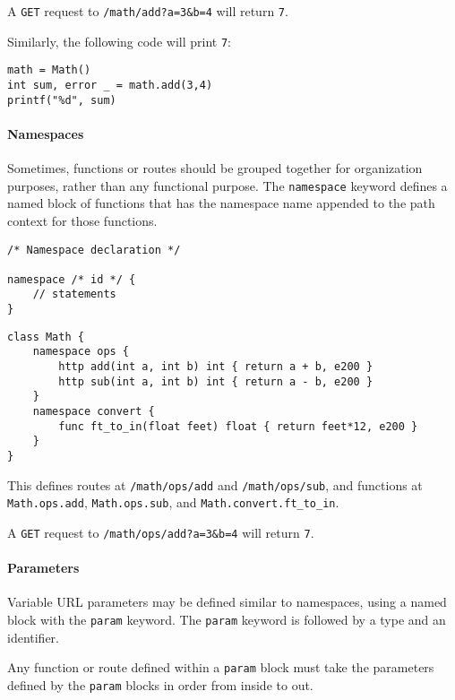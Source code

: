 A \texttt{GET} request to \texttt{/math/add?a=3\&b=4} will return
\texttt{7}.

Similarly, the following code will print \texttt{7}:

\begin{verbatim}
math = Math()
int sum, error _ = math.add(3,4)
printf("%d", sum)
\end{verbatim}

\paragraph{Namespaces}\label{namespaces}

Sometimes, functions or routes should be grouped together for
organization purposes, rather than any functional purpose. The
\texttt{namespace} keyword defines a named block of functions that has
the namespace name appended to the path context for those functions.

\begin{verbatim}
/* Namespace declaration */

namespace /* id */ {
    // statements
}
\end{verbatim}

\begin{verbatim}
class Math {
    namespace ops {
        http add(int a, int b) int { return a + b, e200 }
        http sub(int a, int b) int { return a - b, e200 }
    }
    namespace convert {
        func ft_to_in(float feet) float { return feet*12, e200 }
    }
}
\end{verbatim}

This defines routes at \texttt{/math/ops/add} and
\texttt{/math/ops/sub}, and functions at \texttt{Math.ops.add},
\texttt{Math.ops.sub}, and \texttt{Math.convert.ft\_to\_in}.

A \texttt{GET} request to \texttt{/math/ops/add?a=3\&b=4} will return
\texttt{7}.

\paragraph{Parameters}\label{parameters}

Variable URL parameters may be defined similar to namespaces, using a
named block with the \texttt{param} keyword. The \texttt{param} keyword
is followed by a type and an identifier.

Any function or route defined within a \texttt{param} block must take
the parameters defined by the \texttt{param} blocks in order from inside
to out.

